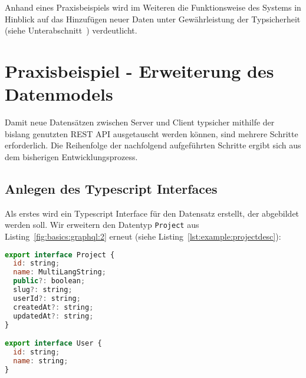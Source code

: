 Anhand eines Praxisbeispiels wird im Weiteren die Funktionsweise des Systems in Hinblick auf das Hinzufügen neuer Daten
unter Gewährleistung der Typsicherheit (siehe Unterabschnitt~) verdeutlicht.

\section{Praxisbeispiel - Erweiterung des Datenmodels}
\label{sec:requirements:example}

Damit neue Datensätzen zwischen Server und Client typsicher mithilfe der bislang genutzten REST API ausgetauscht werden können, sind mehrere Schritte erforderlich.
Die Reihenfolge der nachfolgend aufgeführten Schritte ergibt sich aus dem bisherigen Entwicklungsprozess.

\subsection{Anlegen des Typescript Interfaces}
\label{sec:requirements:example:interface}

Als erstes wird ein Typescript Interface für den Datensatz erstellt, der abgebildet werden soll.
Wir erweitern den Datentyp \texttt{Project} aus Listing~\ref{fig:basics:graphql:2} erneut (siehe Listing~\ref{lst:example:projectdesc}):

\begin{lstlisting}[language=JavaScript,float=h!,caption={Typescript Interface für die Darstellung eines Projektes}, label={lst:example:projectdesc}]
export interface Project {
  id: string;
  name: MultiLangString;
  public?: boolean;
  slug?: string;
  userId?: string;
  createdAt?: string;
  updatedAt?: string;
}

export interface User {
  id: string;
  name: string;
}
\end{lstlisting}

